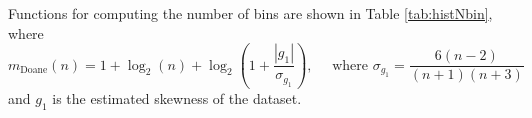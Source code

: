 \noindent Functions for computing the number of bins are shown in Table \ref{tab:histNbin}, where \[ m_{\mathrm{Doane}}(n) = 1 + \log_2 (n) + \log_2 \left( 1 + \dfrac{|g_1|}{\sigma_{g_1}} \right), \quad   \text{ where } \sigma_{g_1} = \frac{6(n-2)}{(n+1)(n+3)}\] and $g_1$ is the estimated skewness of the dataset. 

















